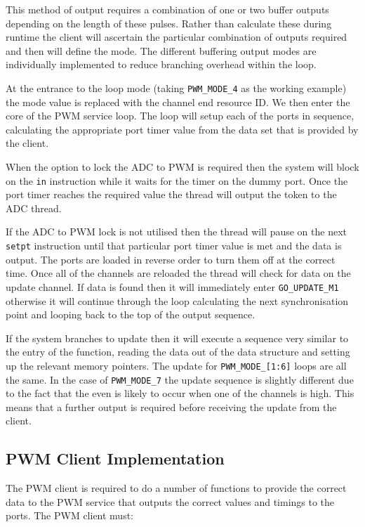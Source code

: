 This method of output requires a combination of one or two buffer outputs depending on the length of these pulses. Rather than calculate these during runtime the client will ascertain the particular combination of outputs required and then will define the mode. The different buffering output modes are individually implemented to reduce branching overhead within the loop.

At the entrance to the loop mode (taking \verb=PWM_MODE_4= as the working example) the mode value is replaced with the channel end resource ID. We then enter the core of the PWM service loop. The loop will setup each of the ports in sequence, calculating the appropriate port timer value from the data set that is provided by the client.

When the option to lock the ADC to PWM is required then the system will block on the \verb=in= instruction while it waits for the timer on the dummy port. Once the port timer reaches the required value the thread will output the token to the ADC thread.

If the ADC to PWM lock is not utilised then the thread will pause on the next \verb=setpt= instruction until that particular port timer value is met and the data is output. The ports are loaded in reverse order to turn them off at the correct time. Once all of the channels are reloaded the thread will check for data on the update channel. If data is found then it will immediately enter \verb=GO_UPDATE_M1= otherwise it will continue through the loop calculating the next synchronisation point and looping back to the top of the output sequence.

If the system branches to update then it will execute a sequence very similar to the entry of the function, reading the data out of the data structure and setting up the relevant memory pointers. The update for \verb=PWM_MODE_[1:6]= loops are all the same. In the case of \verb=PWM_MODE_7= the update sequence is slightly different due to the fact that the even is likely to occur when one of the channels is high. This means that a further output is required before receiving the update from the client.

\subsection{PWM Client Implementation}
The PWM client is required to do a number of functions to provide the correct data to the PWM service that outputs the correct values and timings to the ports. The PWM client must:

